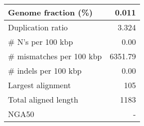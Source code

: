 \documentclass[12pt,a4paper]{article}
\begin{document}
\begin{table}[ht]
\begin{center}
\begin{tabular}{|l*{1}{|r}|}
Genome fraction (\%) & 0.011 \\ \hline
Duplication ratio & 3.324 \\ \hline
\# N's per 100 kbp & 0.00 \\ \hline
\# mismatches per 100 kbp & 6351.79 \\ \hline
\# indels per 100 kbp & 0.00 \\ \hline
Largest alignment & 105 \\ \hline
Total aligned length & 1183 \\ \hline
NGA50 & - \\ \hline
\end{tabular}
\end{center}
\end{table}
\end{document}
